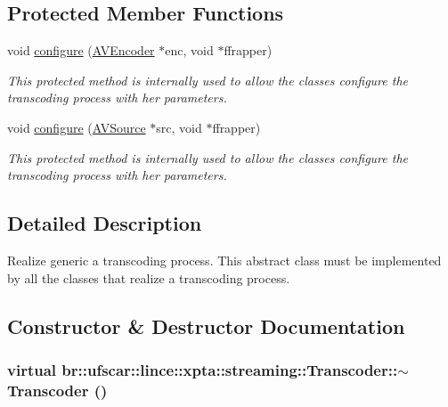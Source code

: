 \subsection*{Protected Member Functions}
\begin{DoxyCompactItemize}
\item 
void \hyperlink{classbr_1_1ufscar_1_1lince_1_1xpta_1_1streaming_1_1Transcoder_a825a6bedbdfef10b910fb793b01ec948}{configure} (\hyperlink{classbr_1_1ufscar_1_1lince_1_1xpta_1_1streaming_1_1AVEncoder}{AVEncoder} $\ast$enc, void $\ast$ffrapper)
\begin{DoxyCompactList}\small\item\em This protected method is internally used to allow the classes configure the transcoding process with her parameters. \item\end{DoxyCompactList}\item 
void \hyperlink{classbr_1_1ufscar_1_1lince_1_1xpta_1_1streaming_1_1Transcoder_a1bdc5f7bbc1aec2d8dcba95ff52bf9fb}{configure} (\hyperlink{classbr_1_1ufscar_1_1lince_1_1xpta_1_1streaming_1_1AVSource}{AVSource} $\ast$src, void $\ast$ffrapper)
\begin{DoxyCompactList}\small\item\em This protected method is internally used to allow the classes configure the transcoding process with her parameters. \item\end{DoxyCompactList}\end{DoxyCompactItemize}


\subsection{Detailed Description}
Realize generic a transcoding process. This abstract class must be implemented by all the classes that realize a transcoding process. 

\subsection{Constructor \& Destructor Documentation}
\hypertarget{classbr_1_1ufscar_1_1lince_1_1xpta_1_1streaming_1_1Transcoder_a12f89baf6afdfa76505494a99b30d730}{
\subsubsection[{$\sim$Transcoder}]{\setlength{\rightskip}{0pt plus 5cm}virtual br::ufscar::lince::xpta::streaming::Transcoder::$\sim$Transcoder ()}}
\label{classbr_1_1ufscar_1_1lince_1_1xpta_1_1streaming_1_1Transcoder_a12f89baf6afdfa76505494a99b30d730}


